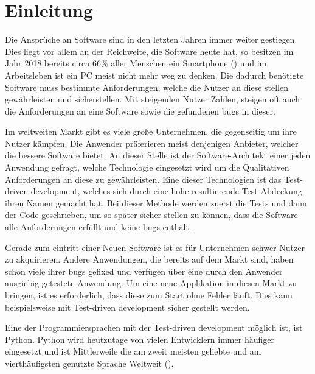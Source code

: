 \section*{Einleitung}\label{einleitung}

Die Ansprüche an Software sind in den letzten Jahren immer weiter gestiegen.
Dies liegt vor allem an der Reichweite, die Software heute hat, so besitzen
im Jahr 2018 bereits circa 66\% aller Menschen ein Smartphone
(\cite{FraukeSchobelt:Smartphone}) und im Arbeitsleben ist ein PC meist nicht
mehr weg zu denken. Die dadurch benötigte Software muss bestimmte
Anforderungen, welche die Nutzer an diese stellen gewährleisten und
sicherstellen. Mit steigenden Nutzer Zahlen, steigen oft auch die Anforderungen
an eine Software sowie die gefundenen \Glspl{bug} in dieser.

Im weltweiten Markt gibt es viele große Unternehmen, die gegenseitig um ihre
Nutzer kämpfen. Die Anwender präferieren meist denjenigen Anbieter, welcher die
bessere Software bietet. An dieser Stelle ist der Software-Architekt einer
jeden Anwendung gefragt, welche Technologie eingesetzt wird um die Qualitativen
Anforderungen an diese zu gewährleisten. Eine dieser Technologien ist das
Test-driven development, welches sich durch eine hohe resultierende
Test-Abdeckung ihren Namen gemacht hat. Bei dieser Methode werden zuerst die
Tests und dann der Code geschrieben, um so später sicher stellen zu können,
dass die Software alle Anforderungen erfüllt und keine \Glspl{bug} enthält.

Gerade zum eintritt einer Neuen Software ist es für Unternehmen schwer Nutzer
zu akquirieren. Andere Anwendungen, die bereits auf dem Markt sind, haben
schon viele ihrer \Glspl{bug} gefixed und verfügen über eine durch den
Anwender ausgiebig getestete Anwendung. Um eine neue Applikation in diesen
Markt zu bringen, ist es erforderlich, dass diese zum Start ohne Fehler läuft.
Dies kann beispielsweise mit Test-driven development sicher gestellt werden.

Eine der Programmiersprachen mit der Test-driven development möglich ist, ist
Python. Python wird heutzutage von vielen Entwicklern immer häufiger eingesetzt
und ist Mittlerweile die am zweit meisten geliebte und am vierthäufigsten
genutzte Sprache Weltweit (\cite{stackoverflow:2019}).

